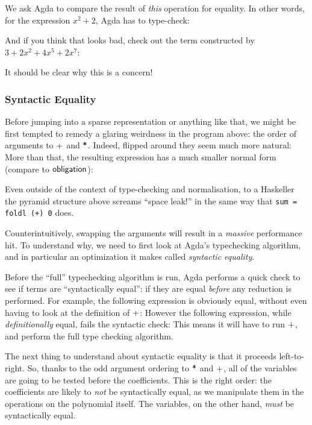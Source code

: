 \documentclass[draft, twocolumn]{article}
\theoremstyle{definition}
\theoremstyle{definition}
\begin{document}
We ask Agda to compare the result of \emph{this} operation for equality. In
other words, for the expression \(x^2 + 2\), Agda has to type-check:

And if you think that looks bad, check out the term constructed by \(3 + 2x^2 +
4x^5 + 2x^7\):
\begin{center}
\end{center}
It should be clear why this is a concern!
\subsubsection{Syntactic Equality}
Before jumping into a sparse representation or anything like that, we might be
first tempted to remedy a glaring weirdness in the program above: the order of
arguments to \(\AgdaFunction{+}\) and \(\AgdaFunction{*}\). Indeed, flipped
around they seem much more natural:
More than that, the resulting expression has a much smaller normal form (compare
to \(\AgdaFunction{obligation}\)):

Even outside of the context of type-checking and normalisation, to a Haskeller
the pyramid structure above screams ``space leak!'' in the same way that
\verb|sum = foldl (+) 0| does.

Counterintuitively, swapping the arguments will result in a \emph{massive}
performance hit. To understand why, we need to first look at Agda's typechecking
algorithm, and in particular an optimization it makes called \emph{syntactic
  equality}.

Before the ``full'' typechecking algorithm is run, Agda performs a quick check
to see if terms are ``syntactically equal'': if they are equal \emph{before} any
reduction is performed. For example, the following expression is obviously
equal, without even having to look at the definition of \(\AgdaFunction{+}\):
However the following expression, while \emph{definitionally} equal, fails the
syntactic check:
This means it will have to run \(\AgdaFunction{+}\), and perform the full type
checking algorithm.

The next thing to understand about syntactic equality is that it proceeds
left-to-right. So, thanks to the odd argument ordering to \(\AgdaFunction{*}\)
and \(\AgdaFunction{+}\), all of the variables are going to be tested before the
coefficients. This is the right order: the coefficients are likely to \emph{not}
be syntactically equal, as we manipulate them in the operations on the
polynomial itself. The variables, on the other hand, \emph{must} be
syntactically equal.
\end{document}
